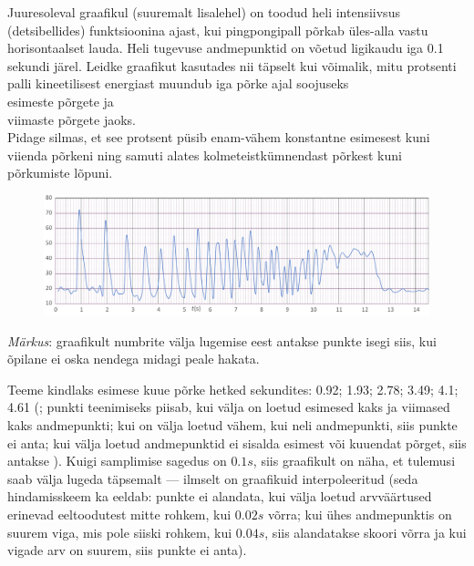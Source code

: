 
Juuresoleval graafikul (suuremalt lisalehel) on toodud heli intensiivsus (detsibellides) funktsioonina ajast, kui pingpongipall põrkab üles-alla vastu horisontaalset lauda. Heli tugevuse andmepunktid on võetud ligikaudu iga \num{0.1} sekundi järel. Leidke graafikut kasutades nii täpselt kui võimalik, mitu protsenti palli kineetilisest energiast muundub iga põrke ajal soojuseks\\
\osa esimeste põrgete ja \\
\osa viimaste põrgete jaoks.\\
Pidage silmas, et see protsent püsib enam-vähem konstantne esimesest kuni viienda põrkeni ning samuti alates kolmeteistkümnendast põrkest kuni põrkumiste lõpuni.
\begin{figure}[!h]
  \centering
  \includegraphics[width=\textwidth]{2022-v2g-10-yl.pdf}
\end{figure}


\hint

\solu
\emph{Märkus}: graafikult numbrite välja lugemise eest antakse punkte isegi siis, kui õpilane ei oska nendega midagi peale hakata.

\osa Teeme kindlaks esimese kuue põrke hetked sekundites: \num{0,92}; \num{1,93}; \num{2,78}; \num{3,49}; \num{4,1}; \num{4.61} (; punkti teenimiseks piisab, kui välja on loetud esimesed kaks ja viimased kaks andmepunkti; kui on välja loetud vähem, kui neli andmepunkti, siis punkte ei anta; kui välja loetud andmepunktid ei sisalda esimest või kuuendat põrget, siis antakse ). Kuigi samplimise sagedus on $\SI{0.1}s$, siis graafikult on näha, et tulemusi saab välja lugeda täpsemalt --- ilmselt on graafikuid interpoleeritud (seda hindamisskeem ka eeldab: punkte ei alandata, kui välja loetud arvväärtused erinevad eeltoodutest mitte rohkem, kui $\SI{0.02}s$ võrra; kui ühes andmepunktis on suurem viga, mis pole siiski rohkem, kui  $\SI {0.04}s$, siis alandatakse skoori  võrra ja kui vigade arv on suurem, siis punkte ei anta).

